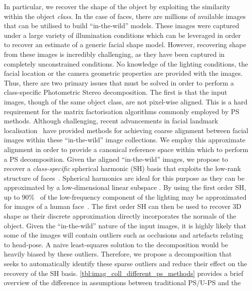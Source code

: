 In particular, we recover the shape of the object by exploiting the
similarity within the object \textit{class}. 
In the case of faces, there are millions of
available images that can be utilised to build ``in-the-wild'' models. These images
were captured under a large variety of illumination conditions which can be
leveraged in order to recover an estimate of a generic facial shape model.
However, recovering shape from these images is incredibly challenging, as they have been
captured in completely unconstrained conditions. No knowledge of the lighting
conditions, the facial location or the camera geometric properties are provided
with the images. Thus, there are two primary issues that must be solved in
order to perform a class-specific Photometric Stereo decomposition. The first
is that the input images, though of the same object class, are not
pixel-wise aligned. This is a hard requirement for the matrix factorisation
algorithms commonly employed by PS methods. Although challenging, recent
advancements in facial landmark localisation~\cite{cootes2001active} have
provided methods for achieving coarse alignment between facial images within
these ``in-the-wild'' image collections. We employ this approximate alignment
in order to provide a canonical reference space within which to perform
a PS decomposition. Given the aligned ``in-the-wild'' images, we propose to
recover a \textit{class-specific} spherical harmonic (SH)
basis that exploits the low-rank structure of
faces~\cite{georghiades2001fromfew,Basri:2003ie}. Spherical harmonics are ideal for
this purpose as they can be approximated by a low-dimensional linear subspace
\cite{Basri:2003ie,ramamoorthi2001relationship}.
By using the first order SH, up to $90\%$~\cite{yuille1999determining} of
the low-frequency component of the lighting may be approximated for images
of a human face~\cite{Basri:2003ie,%
basri2007photometric,yuille1999determining}. The first order SH
can then be used to recover 3D shape as their discrete approximation directly
incorporates the normals of the object. Given the ``in-the-wild'' nature of
the input images, it is highly likely that some of the images will contain
outliers such as occlusions and artefacts relating to head-pose. A naive
least-squares solution to the decomposition would be heavily biased
by these outliers. Therefore, we propose a decomposition that seeks to
automatically identify these sparse outliers and reduce their effect on
the recovery of the SH basis.
\cref{tbl:imag_coll_different_ps_methods} provides a brief
overview of the difference in assumptions between traditional PS/U-PS and the
